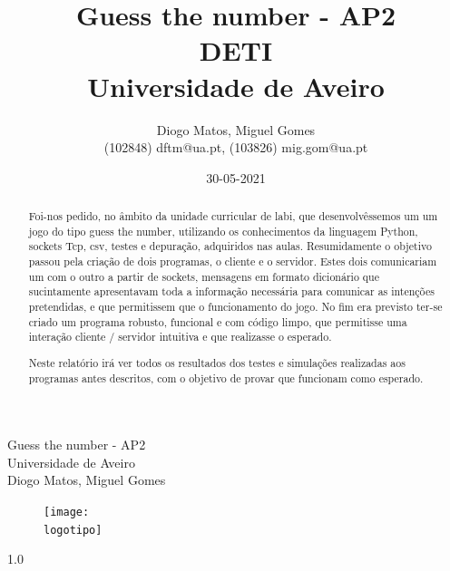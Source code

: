 \documentclass{report}
\theoremstyle{remark}
\begin{document}
%
\def\titulo{Guess the number - AP2}
\def\data{30-05-2021}
\def\autores{Diogo Matos, Miguel Gomes}
\def\autorescontactos{(102848) dftm@ua.pt, (103826) mig.gom@ua.pt}
\def\versao{1.0}
\def\departamento{DETI}
\def\empresa{Universidade de Aveiro}
\def\logotipo{ua.pdf}
%
%
\renewcommand{\contentsname}{Índice}
\begin{titlepage}

\begin{center}
%
\vspace*{50mm}
%
{\Huge \titulo}\\ 

\vspace{10mm}
%
{\Large \empresa}\\
%
\vspace{10mm}
%
{\LARGE \autores}\\ 
%
\vspace{30mm}
%
\begin{figure}[h]
\center
\texttt{[image: \\logotipo]}
\end{figure}
%
\vspace{30mm}
\end{center}
%
\begin{flushright}
\versao
\end{flushright}
\end{titlepage}

\title{%
{\Huge\textbf{\titulo}}\\
{\Large \departamento\\ \empresa}
}
%
\author{%
    \autores \\
    \autorescontactos
}
%
\date{\data}
%
\maketitle


\begin{abstract}
Foi-nos pedido, no âmbito da unidade curricular de \ac{labi}, que desenvolvêssemos um um jogo do tipo guess the number, utilizando os conhecimentos da linguagem Python, sockets Tcp, \ac{csv}, testes e depuração, adquiridos nas aulas. Resumidamente o objetivo passou pela criação de dois programas, o cliente e o servidor. Estes dois comunicariam um com o outro a partir de sockets, mensagens em formato dicionário que sucintamente apresentavam toda a informação necessária para comunicar as intenções pretendidas, e que permitissem que o funcionamento do jogo. No fim era previsto ter-se criado um programa robusto, funcional e com código limpo, que permitisse uma interação cliente / servidor intuitiva e que realizasse o esperado.

Neste relatório irá ver todos os resultados dos testes e simulações realizadas aos programas antes descritos, com o objetivo de provar que funcionam como esperado.
\end{abstract}
\end{document}
